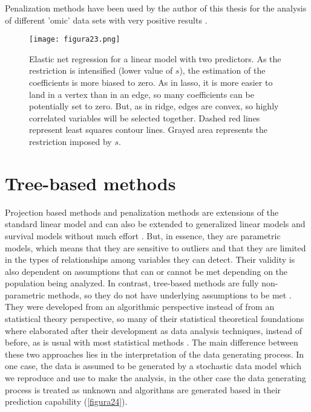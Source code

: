 Penalization methods have been used by the author of this thesis for the analysis of different 'omic' data sets with very positive results \parencite{yanez2015two, gonzalez2017prognostic, 10.1371/journal.pone.0202926}.

\begin{figure}[hbtp]
\centering
\texttt{[image: figura23.png]}
\caption[Elastic net regression for a linear model with two predictors]{Elastic net regression for a linear model with two predictors. As the restriction is intensified (lower value of $s$), the estimation of the coefficients is more biased to zero. As in lasso, it is more easier to land in a vertex than in an edge, so many coefficients can be potentially set to zero. But, as in ridge, edges are convex, so highly correlated variables will be selected together. Dashed red lines represent least squares contour lines. Grayed area represents the restriction imposed by $s$.}
\label{figura23}
\end{figure}

\section{Tree-based methods}
Projection based methods and penalization methods are extensions of the standard linear model and can also be extended to generalized linear models and survival models without much effort \parencite{nygaard2008partial, simon2011regularization}. But, in essence, they are parametric models, which means that they are sensitive to outliers \parencite{liebmann2010robust, park2016robust} and that they are limited in the types of relationships among variables they can detect. Their validity is also dependent on assumptions that can or cannot be met depending on the population being analyzed. In contrast, tree-based methods are fully non-parametric methods, so they do not have underlying assumptions to be met \parencite{timofeev2004classification}. They were developed from an algorithmic perspective instead of from an statistical theory perspective, so many of their statistical theoretical foundations where elaborated after their development as data analysis techniques, instead of before, as is usual with most statistical methods \parencite{breiman2001statistical}. The main difference between these two approaches lies in the interpretation of the data generating process. In one case, the data is assumed to be generated by a stochastic data model which we reproduce and use to make the analysis, in the other case the data generating process is treated as unknown and algorithms are generated based in their prediction capability (\autoref{figura24}).

